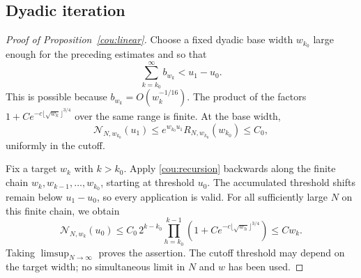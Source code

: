 \subsection{Dyadic iteration}

\begin{proof}[Proof of Proposition~\ref{cou:linear}]
Choose a fixed dyadic base width $w_{k_0}$ large enough for the preceding
estimates and so that
\[
 \sum_{k=k_0}^{\infty}b_{w_k}<u_1-u_0.
\]
This is possible because $b_{w_k}=O(w_k^{-1/16})$.
The product of the factors $1+Ce^{-c\lfloor\sqrt{w_k}\rfloor^{3/4}}$
over the same range is finite. At the base width,
\[
 \mathcal N_{N,w_{k_0}}(u_1)
 \le e^{w_{k_0}u_1}R_{N,w_{k_0}}(w_{k_0})\le C_0,
\]
uniformly in the cutoff.

Fix a target $w_k$ with $k>k_0$. Apply \eqref{cou:recursion} backwards
along the finite chain $w_k,w_{k-1},\ldots,w_{k_0}$, starting at threshold
$u_0$. The accumulated threshold shifts remain below $u_1-u_0$, so every
application is valid. For all sufficiently large $N$ on this finite
chain, we obtain
\[
 \mathcal N_{N,w_k}(u_0)
 \le C_0\,2^{k-k_0}
       \prod_{h=k_0}^{k-1}
         \left(1+Ce^{-c\lfloor\sqrt{w_h}\rfloor^{3/4}}\right)
 \le Cw_k.
\]
Taking $\limsup_{N\to\infty}$ proves the assertion. The cutoff threshold
may depend on the target width; no simultaneous limit in $N$ and $w$
has been used.
\end{proof}
